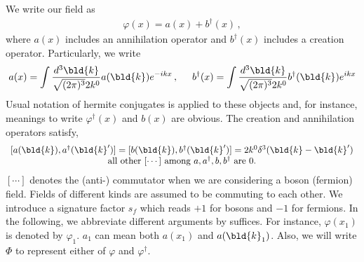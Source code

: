We write our field as
\begin{eqnarray}
\varphi(x) = a(x) + b^\dagger(x)\,,
\end{eqnarray}
where $a(x)$ includes an annihilation operator and $b^\dagger(x)$ includes a creation operator.
Particularly, we write
\begin{eqnarray}
a(x) = \int \frac{d^3 \bld{k}}{\sqrt{(2\pi)^3}2k^0} a(\bld{k}) e^{- ikx}\,,
\hspace{5mm}
b^\dagger(x) = \int \frac{d^3 \bld{k}}{\sqrt{(2\pi)^3}2k^0} b^\dagger(\bld{k}) e^{ikx}
\end{eqnarray}
Usual notation of hermite conjugates is applied to these objects and, for instance, 
meanings to write $\varphi^\dagger(x)$ and $b(x)$ are obvious.
The creation and annihilation operators satisfy,
\begin{eqnarray}
\begin{array}{c}
[a(\bld{k}), a^\dagger(\bld{k}')] = [b(\bld{k}), b^\dagger(\bld{k}')] = 2k^0 \delta^3(\bld{k}-\bld{k}')
\\
\mbox{all other }[\cdots] \mbox{ among }a, a^\dagger, b, b^\dagger \mbox{ are } 0.
\end{array}
\end{eqnarray}
$[\cdots]$ denotes the (anti-) commutator when we are considering
a boson (fermion) field. Fields of different kinds are assumed to be commuting to each other.
We introduce a signature factor $s_f$ which reads $+1$ for bosons and $-1$ for fermions.
In the following, we abbreviate different arguments by suffices. For instance, 
$\varphi(x_1)$ is denoted by $\varphi_1$. $a_1$ can mean both $a(x_1)$ and $a(\bld{k}_1)$.
Also, we will write $\Phi$ to represent either of $\varphi$ and $\varphi^\dagger$.

